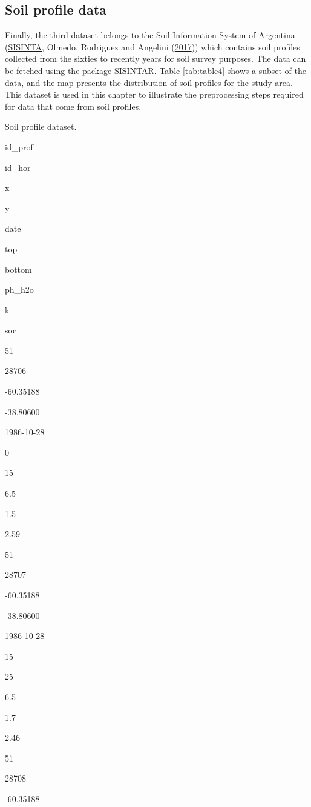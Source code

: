 \documentclass[
  10pt,
  b5paper,
  oneside]{book}
\begin{document}
\hypertarget{soil-profile-data}{%
\subsection{Soil profile data}\label{soil-profile-data}}

Finally, the third dataset belongs to the Soil Information System of Argentina (\href{http://sisinta.inta.gob.ar/}{SISINTA}, Olmedo, Rodriguez and Angelini (\protect\hyperlink{ref-Olmedo2017}{2017})) which contains soil profiles collected from the sixties to recently years for soil survey purposes. The data can be fetched using the package \href{https://github.com/INTA-Suelos/SISINTAR\#readme}{SISINTAR}. Table \ref{tab:table4} shows a subset of the data, and the map presents the distribution of soil profiles for the study area. This dataset is used in this chapter to illustrate the preprocessing steps required for data that come from soil profiles.

\label{tab:table4}Soil profile dataset.

id\_prof

id\_hor

x

y

date

top

bottom

ph\_h2o

k

soc

51

28706

-60.35188

-38.80600

1986-10-28

0

15

6.5

1.5

2.59

51

28707

-60.35188

-38.80600

1986-10-28

15

25

6.5

1.7

2.46

51

28708

-60.35188
\end{document}
